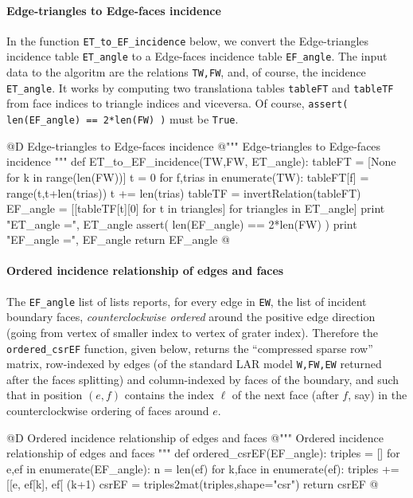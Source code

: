 \documentclass[11pt,oneside]{article}    %
\begin{document}
\paragraph{Edge-triangles to Edge-faces incidence}

In the function \texttt{ET\_to\_EF\_incidence} below, we convert the Edge-triangles incidence table \texttt{ET\_angle} to a Edge-faces incidence table \texttt{EF\_angle}. The input data to the algoritm are the relations \texttt{TW,FW}, and, of course, the incidence \texttt{ET\_angle}. It works by computing two translationa tables \texttt{tableFT} and \texttt{tableTF} from face indices to triangle indices and viceversa. Of course, \texttt{assert( len(EF\_angle) == 2*len(FW) )} must be \texttt{True}.

@D Edge-triangles to Edge-faces incidence
@{""" Edge-triangles to Edge-faces incidence """
def ET_to_EF_incidence(TW,FW, ET_angle):
    tableFT = [None for k in range(len(FW))]
    t = 0
    for f,trias in enumerate(TW):
        tableFT[f] = range(t,t+len(trias))
        t += len(trias)
    tableTF = invertRelation(tableFT)
    EF_angle = [[tableTF[t][0] for t in triangles] for triangles in ET_angle]
    print "ET_angle =", ET_angle
    assert( len(EF_angle) == 2*len(FW) )
    print "EF_angle =", EF_angle
    return EF_angle
@}


\paragraph{Ordered incidence relationship of edges and faces}

The \texttt{EF\_angle} list of lists reports, for every edge in \texttt{EW}, the list of incident boundary faces, \emph{counterclockwise ordered} around the positive edge direction (going from vertex of smaller index to vertex of grater index). Therefore the \texttt{ordered\_csrEF} function, given below, returns the ``compressed sparse row'' matrix, row-indexed by edges (of the standard LAR model \texttt{W,FW,EW} returned after the faces splitting) and column-indexed by faces of the boundary, and such that in position $(e,f)$ contains the index $\ell$ of the next face (after $f$, say) in the counterclockwise ordering of faces around $e$.

@D Ordered incidence relationship of edges and faces
@{""" Ordered incidence relationship of edges and faces """
def ordered_csrEF(EF_angle):
    triples = []
    for e,ef in enumerate(EF_angle):
        n = len(ef)
        for k,face in enumerate(ef):
            triples += [[e, ef[k], ef[ (k+1)%
    csrEF = triples2mat(triples,shape="csr")
    return csrEF
@}
\end{document}
